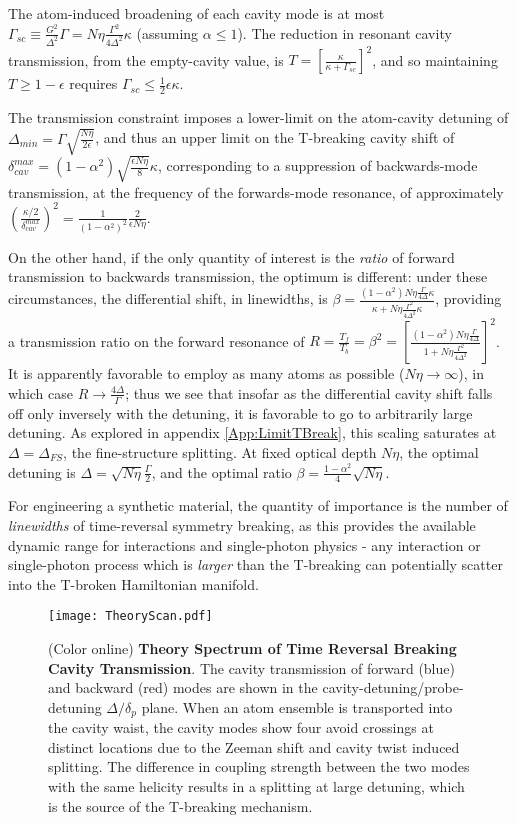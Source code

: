 \documentclass[aps,pra,twocolumn,groupedaddress,10pt,showpacs]{revtex4-1}
\begin{document}
The atom-induced broadening of each cavity mode is at most $\Gamma_{sc}\equiv\frac{G^2}{\Delta^2}\Gamma=N\eta \frac{\Gamma^2}{4\Delta^2}\kappa$ (assuming $\alpha\leq1$). The reduction in resonant cavity transmission, from the empty-cavity value, is $T=\left[\frac{\kappa}{\kappa+\Gamma_{sc}}\right]^2$, and so maintaining $T\geq1-\epsilon$ requires $\Gamma_{sc}\leq \frac{1}{2}\epsilon\kappa$.

The transmission constraint imposes a lower-limit on the atom-cavity detuning of $\Delta_{min}=\Gamma\sqrt{\frac{N\eta}{2\epsilon}}$, and thus an upper limit on the T-breaking cavity shift of $\delta_{cav}^{max}=(1-\alpha^2)\sqrt{\frac{\epsilon N\eta}{8}}\kappa$, corresponding to a suppression of backwards-mode transmission, at the frequency of the forwards-mode resonance, of approximately $\left(\frac{\kappa/2}{\delta_{cav}^{max}}\right)^2=\frac{1}{(1-\alpha^2)^2}\frac{2}{\epsilon N\eta}$.

On the other hand, if the only quantity of interest is the \emph{ratio} of forward transmission to backwards transmission, the optimum is different: under these circumstances, the differential shift, in linewidths, is $\beta=\frac{(1-\alpha^2) N\eta\frac{\Gamma}{4\Delta}\kappa}{\kappa+N\eta \frac{\Gamma^2}{4\Delta^2}\kappa}$, providing a transmission ratio on the forward resonance of $R=\frac{T_f}{T_b}=\beta^2=\left[\frac{(1-\alpha^2)N\eta\frac{\Gamma}{4\Delta}}{1+N\eta\frac{\Gamma^2}{4\Delta^2}}\right]^2$. It is apparently favorable to employ as many atoms as possible ($N\eta\rightarrow\infty$), in which case $R\rightarrow\frac{4\Delta}{\Gamma}$; thus we see that insofar as the differential cavity shift falls off only inversely with the detuning, it is favorable to go to arbitrarily large detuning. As explored in appendix \ref{App:LimitTBreak}, this scaling saturates at $\Delta=\Delta_{FS}$, the fine-structure splitting. At fixed optical depth $N\eta$, the optimal detuning is $\Delta=\sqrt{N\eta}\frac{\Gamma}{2}$, and the optimal ratio $\beta=\frac{1-\alpha^2}{4}\sqrt{N\eta}$.

For engineering a synthetic material, the quantity of importance is the number of \emph{linewidths} of time-reversal symmetry breaking, as this provides the available dynamic range for interactions and single-photon physics - any interaction or single-photon process which is \emph{larger} than the T-breaking can potentially scatter into the T-broken Hamiltonian manifold.

\begin{figure}
\texttt{[image: TheoryScan.pdf]}
\caption{(Color online) \textbf{Theory Spectrum of Time Reversal Breaking Cavity Transmission}. The cavity transmission of forward (blue) and backward (red) modes are shown in the cavity-detuning/probe-detuning $\Delta/\delta_p$ plane. When an atom ensemble is transported into the cavity waist, the cavity modes show four avoid crossings at distinct locations due to the Zeeman shift and cavity twist induced splitting. The difference in coupling strength between the two modes with the same helicity results in a splitting at large detuning, which is the source of the T-breaking mechanism.}
\label{SI_FIG:FullSpec}
\end{figure}
\end{document}
